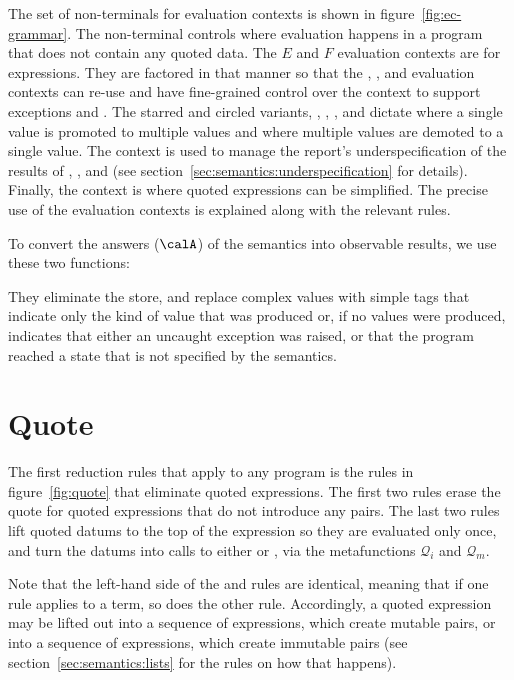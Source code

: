 The set of non-terminals for evaluation contexts is shown in
figure~\ref{fig:ec-grammar}. The  non-terminal controls where
evaluation happens in a program that does not contain any quoted data.
The $E$ and $F$ evaluation contexts are for expressions.  They are factored in
that manner so that the , , and  evaluation contexts can
re-use  and have fine-grained control over the context to support
exceptions and . The starred and circled variants,
\Estar{}, \Eo{}, \Fstar{}, and \Fo{} dictate where a single value is
promoted to multiple values and where multiple values are demoted to a
single value. The  context is used to manage the report's underspecification of the results of , , and  (see section~\ref{sec:semantics:underspecification} for details). Finally, the  context is where quoted expressions can be simplified. The precise use of the evaluation contexts is explained along with the relevant rules.

To convert the answers ($\calA$)  of the semantics into observable results, we use these two functions:


They eliminate the store, and replace complex values with simple tags that indicate only the kind of value that was produced or, if no values were produced, indicates that either an uncaught exception was raised, or that the program reached a state that is not specified by the semantics.

\section{Quote}\label{sec:semantics:quote}

The first reduction rules that apply to any program is the
rules in figure~\ref{fig:quote} that eliminate quoted expressions.
The first two rules erase the quote for quoted expressions that do not introduce any pairs.
The last two rules lift quoted datums to the top of the expression so
they are evaluated only once, and turn the datums into calls to either  or , via the metafunctions $\mathscr{Q}_i$ and $\mathscr{Q}_m$.

Note that the left-hand side of the  and  rules are identical, meaning that if one rule applies to a term, so does the other rule.
Accordingly, a quoted expression may be lifted out into a sequence of  expressions, which create mutable pairs, or into a sequence of  expressions, which create immutable pairs (see section~\ref{sec:semantics:lists} for the rules on how that happens).

